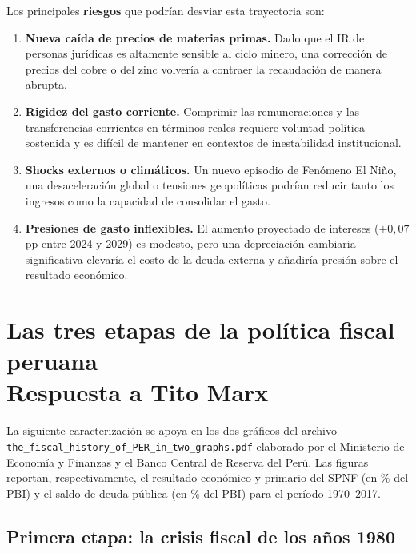 \documentclass[12pt, a4paper]{article}
\newcommand{\emp}[1]{\textbf{#1}}
\begin{document}
\medskip
\noindent Los principales \emp{riesgos} que podrían desviar esta trayectoria son:

\begin{enumerate}[leftmargin=1.5em]
    \item \emp{Nueva caída de precios de materias primas.} Dado que el IR de
          personas jurídicas es altamente sensible al ciclo minero, una
          corrección de precios del cobre o del zinc volvería a contraer la
          recaudación de manera abrupta.
    \item \emp{Rigidez del gasto corriente.} Comprimir las remuneraciones y
          las transferencias corrientes en términos reales requiere voluntad
          política sostenida y es difícil de mantener en contextos de
          inestabilidad institucional.
    \item \emp{Shocks externos o climáticos.} Un nuevo episodio de Fenómeno
          El Niño, una desaceleración global o tensiones geopolíticas podrían
          reducir tanto los ingresos como la capacidad de consolidar el gasto.
    \item \emp{Presiones de gasto inflexibles.} El aumento proyectado de
          intereses ($+0{,}07$ pp entre 2024 y 2029) es modesto, pero una
          depreciación cambiaria significativa elevaría el costo de la deuda
          externa y añadiría presión sobre el resultado económico.
\end{enumerate}


\section{Las tres etapas de la política fiscal peruana\\
         \large Respuesta a Tito Marx}

\noindent La siguiente caracterización se apoya en los dos gráficos del archivo
\texttt{the\_fiscal\_history\_of\_PER\_in\_two\_graphs.pdf} elaborado por el
Ministerio de Economía y Finanzas y el Banco Central de Reserva del Perú.
Las figuras reportan, respectivamente, el resultado económico y primario del
SPNF (en \% del PBI) y el saldo de deuda pública (en \% del PBI) para el
período 1970--2017.

\subsection{Primera etapa: la crisis fiscal de los años 1980}
\end{document}
